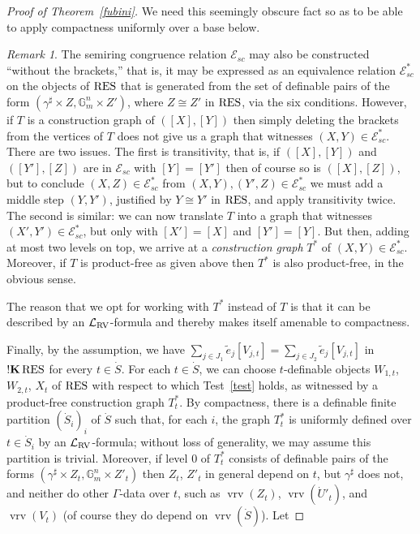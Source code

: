 \documentclass[12pt]{amsart}
\newcommand{\memph}[1]{{\color{magenta}\emph{#1}}}
\theoremstyle{plain}
\theoremstyle{definition}
\theoremstyle{remark}
\newtheorem{rem}[thm]{Remark}
\numberwithin{equation}{section}
\theoremstyle{plain}
\newcommand{\G}{\mathds{G}}
\newcommand{\0}{\emptyset}
\newcommand{\lan}[3]{\mathcal{L}_{#1 \textup{#2} #3}}
\newcommand{\mdl}[1]{\mathcal{#1}}  %
\newcommand{\RES}{\textup{RES}}
\DeclareMathOperator{\sggk}{!\mathbf{K}}
\DeclareMathOperator{\vrv}{vrv}
\begin{document}
\begin{proof}[Proof of Theorem~\ref{fubini}]
We need this seemingly obscure fact so as to be able to apply compactness uniformly over a base below.

\begin{rem}
The semiring congruence relation $\mdl E_{sc}$ may also be constructed ``without the brackets,'' that is, it may be  expressed as an equivalence relation $\mdl E^*_{sc}$ on the objects of $\RES$ that is generated from the set of definable pairs of the form $(\gamma^\sharp \times Z, \G^n_{m} \times Z')$, where $Z \cong Z'$ in $\RES$, via the six conditions. However, if $T$ is a construction graph of  $([X], [Y])$ then simply deleting the brackets from the vertices of $T$ does not give us a graph that witnesses $(X, Y) \in \mdl E^*_{sc}$. There are two issues. The first is transitivity, that is, if $([X], [Y])$ and $([Y'], [Z])$ are in  $\mdl E_{sc}$ with $[Y] = [Y']$ then of course so is $([X], [Z])$, but to conclude $(X, Z) \in \mdl E^*_{sc}$ from $(X, Y), (Y', Z) \in  \mdl E^*_{sc}$ we must add a middle step $(Y, Y')$, justified  by $Y \cong Y'$ in $\RES$, and apply transitivity twice. The second is similar: we can now translate $T$ into a graph that witnesses $(X', Y') \in \mdl E^*_{sc}$, but only with $[X'] = [X]$ and $[Y'] = [Y]$. But then, adding at most two levels on top, we arrive at a \memph{construction graph} $T^*$ of $(X, Y) \in \mdl E^*_{sc}$. Moreover, if $T$ is product-free as given above then $T^*$ is also  product-free, in the obvious sense.
\end{rem}
The reason that we  opt for working with $T^*$ instead of $T$ is that it can be described by  an $\lan{}{RV}{}$-formula and thereby makes itself amenable to compactness.


Finally, by the assumption, we have $\sum_{j\in J_1} \tilde e_j [V_{j,t}] =  \sum_{j\in J_2} \tilde e_j [V_{j,t}] $ in $\sggk \RES$ for every $t \in \dot S$. For each $t \in \dot S$, we can choose $t$-definable objects $W_{1,t}$, $W_{2,t}$, $X_t$ of $\RES$ with respect to which Test~\ref{test} holds, as witnessed by a product-free construction graph $T^*_t$. By compactness, there is a definable finite partition $(\dot S_i)_i$ of $\dot S$ such that, for each $i$, the graph $T^*_t$ is uniformly defined over $t \in \dot S_i$ by an $\lan{}{RV}{}$-formula; without loss of generality, we may assume this partition is trivial. Moreover, if level $0$ of $T^*_t$ consists of definable pairs of the forms $(\gamma^\sharp \times Z_t, \G^n_{m} \times Z'_t)$ then $Z_t$, $Z'_t$ in general depend on $t$, but $\gamma^\sharp$ does not, and neither do other $\Gamma$-data over $t$, such as $\vrv(Z_t)$, $\vrv(\dot U'_t)$, and $\vrv(V_t)$ (of course they do depend on $\vrv(\dot S)$). Let


\end{proof}
\end{document}
